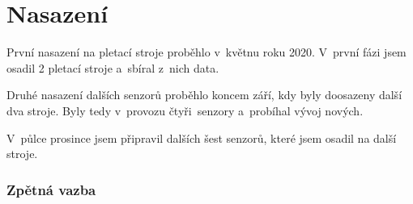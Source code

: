 \chapter{Nasazení}
První nasazení na pletací stroje proběhlo v~květnu roku 2020.
V~první fázi jsem osadil 2 pletací stroje a~sbíral z~nich data.

Druhé nasazení dalších senzorů proběhlo koncem září, kdy byly doosazeny další dva stroje.
Byly tedy v~provozu čtyři~senzory a~probíhal vývoj nových.

V~půlce prosince jsem připravil dalších šest senzorů, které jsem osadil na další stroje.


\subsection{Zpětná vazba}






\newpage